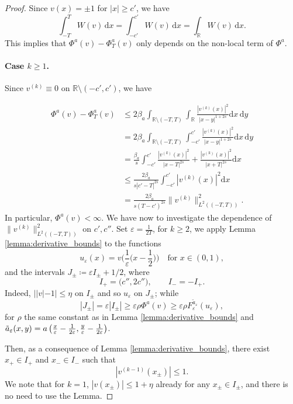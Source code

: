 \documentclass{article}
\theoremstyle{definition}
\newcommand{\de}{\mathrm{d}}
\newcommand{\R}{\mathbb{R}}
\newcommand{\e}{\varepsilon}
\def\e{\varepsilon}
\begin{document}
\begin{proof}  Since $v(x) = \pm 1$ for $|x|\geq c'$, we have
    \[\int_{-T}^{T}W(v)\,\de x=\int_{-c'}^{c'}W(v)\,\de x = \int_{\R}W(v)\,\de x.\]
   This implies that $\Phi^a(v)-\Phi^a_T(v)$ only depends on the non-local term of $\Phi^a$. 
    
\paragraph{Case $k\geq 1$.} Since $v^{(k)}\equiv 0$ on $\R\setminus (-c',c')$, we have
    
\begin{equation}\label{eq:tail_stima_generale}
\begin{split}
    \Phi^a(v ) -\Phi^a_T(v )
    &\le2\beta_a\int_{\R\setminus(-T,T)}\int_{\R}\frac{| v^{(k)}(x)|^2}{|x-y|^{1+2s}}\de x\,\de y\\
    &=2\beta_a\int_{\R\setminus(-T,T)}\int_{-c'}^{c'}\frac{| v^{(k)}(x)|^2}{|x-y|^{1+2s}}\de x\,\de y\\
    &=\frac{\beta_a}{s}  \int_{-c'}^{c'}\frac{| v^{(k)}(x)|^2}{|x-T|^{2s}}+ \frac{| v^{(k)}(x)|^2}{|x+T|^{2s}}\de x \\  
    &\leq \frac{2\beta_a}{s|c'-T|^{2s}}  \int_{-c'}^{c'}|v^{(k)}(x)|^2\de x \\
    &= \frac{2\beta_a}{s(T-c')^{2s}}\|v^{(k)}\|^2_{L^2((-T,T))}.
\end{split}
\end{equation}
In particular, $\Phi^a(v)<\infty$.
    We have now to investigate the dependence of $\|v^{(k)}\|^2_{L^2((-T,T))}$ on $c',c''$.
   Set $\e=\frac{1}{2T}$, for $k\geq 2$, we apply Lemma \ref{lemma:derivative_bounds}  to the functions 
   \[u_\e(x)=v\Big(\frac{1}{\e}\Big(x-\frac{1}{2}\Big)\Big) \quad \text{for }x\in(0,1),\]
   and the intervals $J_\pm\coloneqq\e I_\pm+1/2$, where
    \[I_+=\big(c'',2c''\big), \qquad I_- =-I_+.\]
    Indeed,  $||v|-1|\leq \eta$ on $I_\pm$ and so $u_\e$ on $J_\pm$; while 
    \[|J_\pm|=\e |I_\pm|\geq \e\rho \Phi^a(v)\geq\e\rho F_\e^{\tilde{a}_\e}(u_\e),\] 
   for $\rho$ the same constant as in Lemma \ref{lemma:derivative_bounds} and $\Tilde{a}_\e(x,y) = a\left(\frac{x}{\e}-\frac{1}{2\e}, \frac{y}{\e}-\frac{1}{2\e}\right)$.
    
  Then, as a consequence of Lemma \ref{lemma:derivative_bounds}, there exist $x_+\in I_+$ and $x_- \in I_-$ such that 
\[|v^{(k-1)}(x_\pm)|\leq 1.\] 
We note that for $k=1$, $|v(x_\pm)|\leq 1+\eta$ already for any $x_\pm\in I_\pm$, and there is no need to use the Lemma.


\end{proof}
\end{document}
